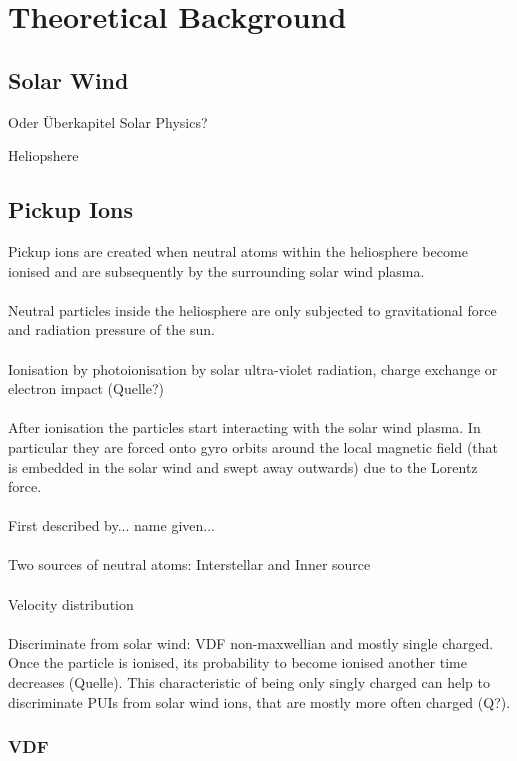 
\chapter{Theoretical Background} %

\label{Chapter1} %





\section{Solar Wind}

Oder Überkapitel Solar Physics?

Heliopshere


\section{Pickup Ions}
Pickup ions are created when neutral atoms within the heliosphere become ionised and are subsequently  by the surrounding solar wind plasma. 
\\ \\
Neutral particles inside the heliosphere are only subjected to gravitational force and radiation pressure of the sun. 
\\ \\
Ionisation by photoionisation by solar ultra-violet radiation, charge exchange or electron impact (Quelle?)
\\ \\
After ionisation the particles start interacting with the solar wind plasma. In particular they are forced onto gyro orbits around the local magnetic field (that is embedded in the solar wind and swept away outwards) due to the Lorentz force.
\\ \\
First described by... name given...
\\ \\
Two sources of neutral atoms: Interstellar and Inner source
\\ \\
Velocity distribution
\\ \\
Discriminate from solar wind: VDF non-maxwellian and mostly single charged.
Once the particle is ionised, its probability to become ionised another time decreases (Quelle). This characteristic of being only singly charged can help to discriminate PUIs from solar wind ions, that are mostly more often charged (Q?).

\subsection{VDF}
